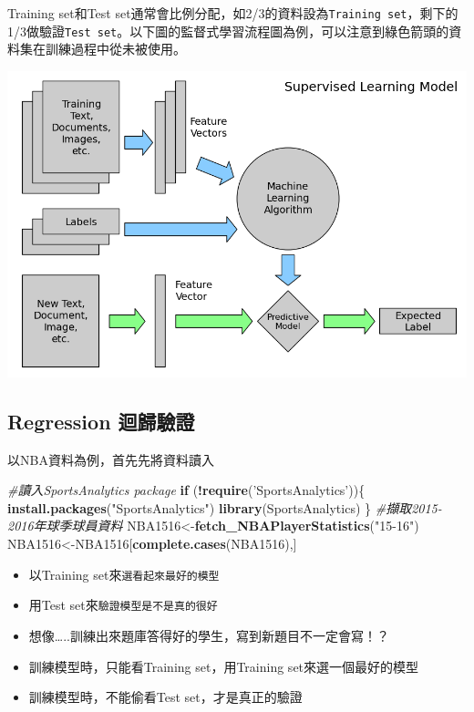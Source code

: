 \documentclass[]{book}
\newenvironment{Shaded}{\begin{snugshade}}{\end{snugshade}}
\newcommand{\CommentTok}[1]{\textcolor[rgb]{0.56,0.35,0.01}{\textit{#1}}}
\newcommand{\ControlFlowTok}[1]{\textcolor[rgb]{0.13,0.29,0.53}{\textbf{#1}}}
\newcommand{\KeywordTok}[1]{\textcolor[rgb]{0.13,0.29,0.53}{\textbf{#1}}}
\newcommand{\NormalTok}[1]{#1}
\newcommand{\OperatorTok}[1]{\textcolor[rgb]{0.81,0.36,0.00}{\textbf{#1}}}
\newcommand{\StringTok}[1]{\textcolor[rgb]{0.31,0.60,0.02}{#1}}
\providecommand{\tightlist}{%
  \setlength{\itemsep}{0pt}\setlength{\parskip}{0pt}}
\begin{document}
Training set和Test set通常會比例分配，如2/3的資料設為\texttt{Training\ set}，剩下的1/3做驗證\texttt{Test\ set}。以下圖的監督式學習流程圖為例，可以注意到綠色箭頭的資料集在訓練過程中從未被使用。

\includegraphics[width=12.5in]{figure/SupervisedLearning}

\hypertarget{regression-ux8ff4ux6b78ux9a57ux8b49}{%
\subsection{Regression 迴歸驗證}\label{regression-ux8ff4ux6b78ux9a57ux8b49}}

以NBA資料為例，首先先將資料讀入

\begin{Shaded}
\begin{Highlighting}[]
\CommentTok{#讀入SportsAnalytics package}
\ControlFlowTok{if}\NormalTok{ (}\OperatorTok{!}\KeywordTok{require}\NormalTok{(}\StringTok{'SportsAnalytics'}\NormalTok{))\{}
    \KeywordTok{install.packages}\NormalTok{(}\StringTok{"SportsAnalytics"}\NormalTok{)}
    \KeywordTok{library}\NormalTok{(SportsAnalytics)}
\NormalTok{\}}
\CommentTok{#擷取2015-2016年球季球員資料}
\NormalTok{NBA1516<-}\KeywordTok{fetch_NBAPlayerStatistics}\NormalTok{(}\StringTok{"15-16"}\NormalTok{)}
\NormalTok{NBA1516<-NBA1516[}\KeywordTok{complete.cases}\NormalTok{(NBA1516),]}
\end{Highlighting}
\end{Shaded}

\begin{itemize}
\tightlist
\item
  以Training set來\texttt{選看起來最好的模型}
\item
  用Test set來\texttt{驗證模型是不是真的很好}
\item
  想像\ldots..訓練出來題庫答得好的學生，寫到新題目不一定會寫！？
\item
  訓練模型時，只能看Training set，用Training set來選一個最好的模型
\item
  訓練模型時，不能偷看Test set，才是真正的驗證
\end{itemize}
\end{document}

